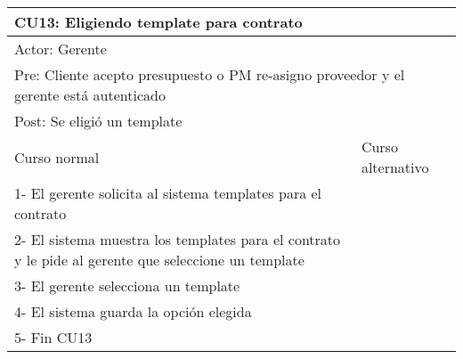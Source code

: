 \begin{table}[H]
  \begin{adjustbox}{max width = \textwidth}
  \begin{tabular}{|l|l|}
    \hline
    \multicolumn{2}{|l|}{CU13: Eligiendo template para contrato} \\\hline
    \multicolumn{2}{|l|}{Actor: Gerente} \\\hline
    \multicolumn{2}{|l|}{Pre: Cliente acepto presupuesto o PM re-asigno proveedor y el gerente está autenticado} \\\hline
    \multicolumn{2}{|l|}{Post: Se eligió un template} \\\hline
     Curso normal & Curso alternativo\\ \hline
     1- El gerente solicita al sistema templates para el contrato & \\ \hline
     2- El sistema muestra los templates para el contrato y le pide al gerente que seleccione un template & \\ \hline
     3- El gerente selecciona un template & \\ \hline
	 4- El sistema guarda la opción elegida & \\ \hline
     5- Fin CU13 & \\ \hline
  \end{tabular}
  \end{adjustbox}
\end{table}


